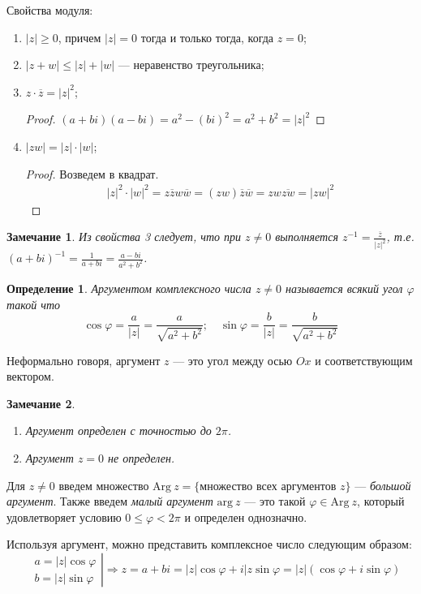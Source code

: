\documentclass[a4paper,12pt]{article}
\newtheorem*{Def}{Определение}
\newtheorem*{Comment}{Замечание}
\newcommand{\Arg}{\mathrm{Arg\:}}
\renewcommand{\arg}{\mathrm{arg\:}}
\begin{document}
Свойства модуля:
\begin{enumerate}
\item $|z| \geqslant 0$, причем $|z| = 0$ тогда и только тогда, когда $z = 0$;
\item $|z + w| \leqslant |z| + |w|$ — неравенство треугольника;
\item $z\cdot\overline{z} = |z|^2$;
\begin{proof}
$(a + bi)(a - bi) = a^2 - (bi)^2 = a^2 + b^2 = |z|^2$
\end{proof}
\item $|zw| = |z| \cdot |w|$;
\begin{proof}
Возведем в квадрат.
\begin{gather*}
|z|^2 \cdot |w|^2 = z \overline{z} w \overline{w} = (zw)\overline{z}\overline{w} = zw\overline{zw} = |zw|^2
\end{gather*}
\end{proof}
\end{enumerate}

\begin{Comment}
Из свойства 3 следует, что при $z \neq 0$ выполняется $z^{-1} = \frac{\overline{z}}{|z|^2}$, т.е. $(a + bi)^{-1} = \frac{1}{a + bi} = \frac{a - bi}{a^2 + b^2}$.
\end{Comment}

\begin{Def}
Аргументом комплексного числа $z \neq 0$  называется всякий угол $\varphi$ такой что 
\[
\cos \varphi = \frac{a}{|z|} = \frac{a}{\sqrt{a^2 + b^2}}; \quad \sin \varphi = \frac{b}{|z|} = \frac{b}{\sqrt{a^2 + b^2}}
\]
\end{Def}
Неформально говоря, аргумент $z$ — это угол между осью $Ox$ и соответствующим вектором.

\begin{Comment} \ 
\begin{enumerate}
\item Аргумент определен с точностью до $2\pi$.
\item Аргумент $z = 0$ не определен.
\end{enumerate}
\end{Comment}
Для $z \neq 0$ введем множество $\Arg z = \{\text{множество всех аргументов $z$}\}$ — \textit{большой аргумент}. Также введем \textit{малый аргумент} $\arg z$ — это такой $\varphi \in \Arg z$, который удовлетворяет условию $0 \leqslant \varphi < 2\pi$ и определен однозначно. 

Используя аргумент, можно представить комплексное число следующим образом:
\[
\left.
\begin{aligned}
&a = |z|\cos \varphi \\
&b = |z|\sin \varphi
\end{aligned} 
\right| \Rightarrow z = a + bi = |z| \cos \varphi + i |z \sin \varphi = |z|(\cos\varphi + i\sin\varphi)
\] 
\end{document}
